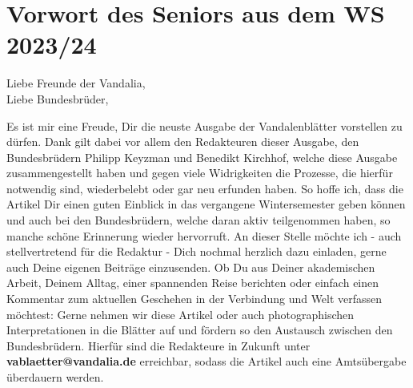 \section{Vorwort des Seniors aus dem WS 2023/24}

Liebe Freunde der Vandalia,\\
Liebe Bundesbrüder,
\begin{multicols}{2}

Es ist mir eine Freude, Dir die neuste Ausgabe der Vandalenblätter vorstellen zu dürfen. Dank gilt dabei vor allem den Redakteuren dieser Ausgabe, den Bundesbrüdern Philipp Keyzman und Benedikt Kirchhof, welche diese Ausgabe zusammengestellt haben und gegen viele Widrigkeiten die Prozesse, die hierfür notwendig sind, wiederbelebt oder gar neu erfunden haben. So hoffe ich, dass die Artikel Dir einen guten Einblick in das vergangene Wintersemester geben können und auch bei den Bundesbrüdern, welche daran aktiv teilgenommen haben, so manche schöne Erinnerung wieder hervorruft. An dieser Stelle möchte ich - auch stellvertretend für die Redaktur - Dich nochmal herzlich dazu einladen, gerne auch Deine eigenen Beiträge einzusenden. Ob Du aus Deiner akademischen Arbeit, Deinem Alltag, einer spannenden Reise berichten oder einfach einen Kommentar zum aktuellen Geschehen in der Verbindung und Welt verfassen möchtest: Gerne nehmen wir diese Artikel oder auch photographischen Interpretationen in die Blätter auf und fördern so den Austausch zwischen den Bundesbrüdern. Hierfür sind die Redakteure in Zukunft unter \textbf{vablaetter@vandalia.de} erreichbar, sodass die Artikel auch eine Amtsübergabe überdauern werden.


\end{multicols}
